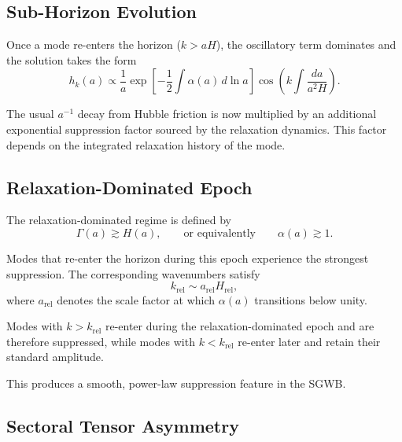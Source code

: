 \documentclass[11pt,a4paper]{article}
\begin{document}
\subsection{Sub-Horizon Evolution}

Once a mode re-enters the horizon (\(k > aH\)), the oscillatory term dominates and the solution
takes the form
\begin{equation}
h_{k}(a) \propto \frac{1}{a} \exp\!\left[ -\frac{1}{2}\int \alpha(a)\, d\ln a \right]
\cos\!\left( k\int \frac{da}{a^{2}H} \right).
\end{equation}

The usual \(a^{-1}\) decay from Hubble friction is now multiplied by an additional exponential
suppression factor sourced by the relaxation dynamics. This factor depends on the integrated
relaxation history of the mode.


\subsection{Relaxation-Dominated Epoch}

The relaxation-dominated regime is defined by
\begin{equation}
\Gamma(a) \gtrsim H(a),
\qquad\text{or equivalently}\qquad
\alpha(a) \gtrsim 1.
\end{equation}

Modes that re-enter the horizon during this epoch experience the strongest suppression. The
corresponding wavenumbers satisfy
\begin{equation}
k_{\mathrm{rel}} \sim a_{\mathrm{rel}} H_{\mathrm{rel}},
\end{equation}
where \(a_{\mathrm{rel}}\) denotes the scale factor at which \(\alpha(a)\) transitions below unity.

Modes with \(k > k_{\mathrm{rel}}\) re-enter during the relaxation-dominated epoch and are therefore
suppressed, while modes with \(k < k_{\mathrm{rel}}\) re-enter later and retain their standard amplitude.

This produces a smooth, power-law suppression feature in the SGWB.


\subsection{Sectoral Tensor Asymmetry}
\end{document}
